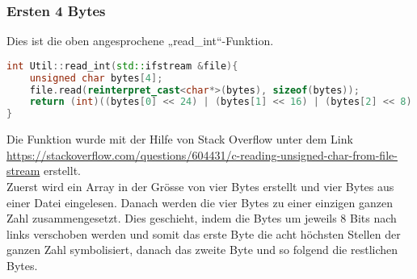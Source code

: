 \subsubsection{Ersten 4 Bytes}
\label{sec:RealErsten4BytesCode}
Dies ist die oben angesprochene „read\_int“-Funktion.
\begin{lstlisting}[language=C++]
int Util::read_int(std::ifstream &file){
    unsigned char bytes[4];
    file.read(reinterpret_cast<char*>(bytes), sizeof(bytes));
    return (int)((bytes[0] << 24) | (bytes[1] << 16) | (bytes[2] << 8) | bytes[3]);
}
\end{lstlisting}
Die Funktion wurde mit der Hilfe von Stack Overflow unter dem Link \url{https://stackoverflow.com/questions/604431/c-reading-unsigned-char-from-file-stream} erstellt.
\\
Zuerst wird ein Array in der Grösse von vier Bytes erstellt und vier Bytes aus einer Datei eingelesen. Danach werden die vier Bytes zu einer einzigen ganzen Zahl zusammengesetzt. Dies geschieht, indem die Bytes um jeweils 8 Bits nach links verschoben werden und somit das erste Byte die acht höchsten Stellen der ganzen Zahl symbolisiert, danach das zweite Byte und so folgend die restlichen Bytes.

